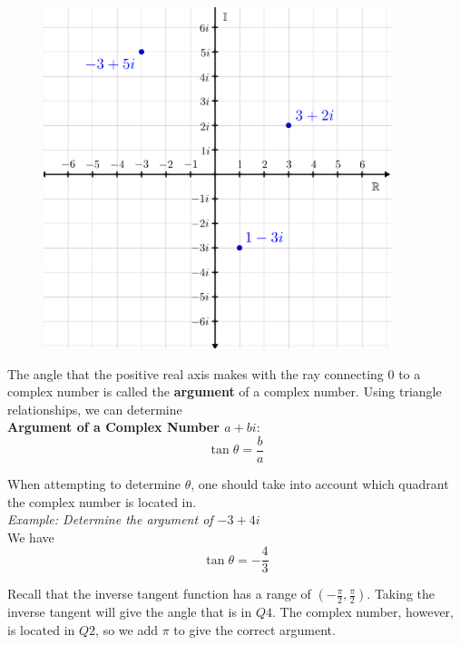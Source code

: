         \begin{figure} [hbt!]
            \centering
            \includegraphics[scale=0.75]{Resources/Unit4Complex/complex.PNG}
        \end{figure}

        \noindent The angle that the positive real axis makes with the ray connecting 0 to a
        complex number is called the \textbf{argument} of a complex number. Using triangle
        relationships, we can determine \\

        \noindent \textbf{Argument of a Complex Number $a+bi$}: \\
        \begin{equation*}
            \tan\theta=\frac{b}{a}
        \end{equation*}

        \noindent When attempting to determine $\theta$, one should take into account which
        quadrant the complex number is located in. \\
        \textit{Example: Determine the argument of $-3+4i$} \\
        We have \\

        \begin{equation*}
            \tan\theta=-\frac{4}{3}
        \end{equation*}

        \noindent Recall that the inverse tangent function has a range of $(-\frac{\pi}{2},\frac{\pi}{2})$.
        Taking the inverse tangent will give the angle that is in $Q4.$ The complex number,
        however, is located in $Q2$, so we add $\pi$ to give the correct argument. \\

